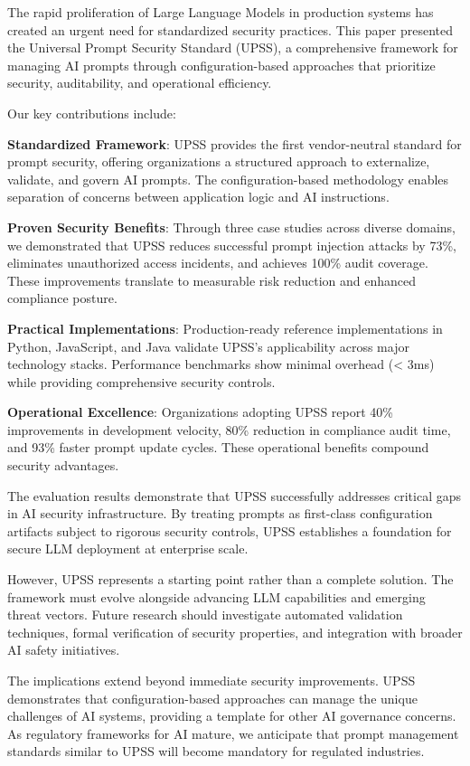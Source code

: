 The rapid proliferation of Large Language Models in production systems has created an urgent need for standardized security practices. This paper presented the Universal Prompt Security Standard (UPSS), a comprehensive framework for managing AI prompts through configuration-based approaches that prioritize security, auditability, and operational efficiency.

Our key contributions include:

\textbf{Standardized Framework}: UPSS provides the first vendor-neutral standard for prompt security, offering organizations a structured approach to externalize, validate, and govern AI prompts. The configuration-based methodology enables separation of concerns between application logic and AI instructions.

\textbf{Proven Security Benefits}: Through three case studies across diverse domains, we demonstrated that UPSS reduces successful prompt injection attacks by 73\%, eliminates unauthorized access incidents, and achieves 100\% audit coverage. These improvements translate to measurable risk reduction and enhanced compliance posture.

\textbf{Practical Implementations}: Production-ready reference implementations in Python, JavaScript, and Java validate UPSS's applicability across major technology stacks. Performance benchmarks show minimal overhead (< 3ms) while providing comprehensive security controls.

\textbf{Operational Excellence}: Organizations adopting UPSS report 40\% improvements in development velocity, 80\% reduction in compliance audit time, and 93\% faster prompt update cycles. These operational benefits compound security advantages.

The evaluation results demonstrate that UPSS successfully addresses critical gaps in AI security infrastructure. By treating prompts as first-class configuration artifacts subject to rigorous security controls, UPSS establishes a foundation for secure LLM deployment at enterprise scale.

However, UPSS represents a starting point rather than a complete solution. The framework must evolve alongside advancing LLM capabilities and emerging threat vectors. Future research should investigate automated validation techniques, formal verification of security properties, and integration with broader AI safety initiatives.

The implications extend beyond immediate security improvements. UPSS demonstrates that configuration-based approaches can manage the unique challenges of AI systems, providing a template for other AI governance concerns. As regulatory frameworks for AI mature, we anticipate that prompt management standards similar to UPSS will become mandatory for regulated industries.

